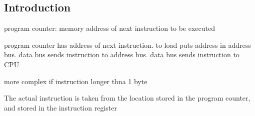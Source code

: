 
\subsection{Introduction}

program counter: memory address of next instruction to be executed

program counter has address of next instruction. to load puts address in address bus. data bus sends instruction to address bus. data bus sends instruction to CPU

more complex if instruction longer thna 1 byte

The actual instruction is taken from the location stored in the program counter, and stored in the instruction register

